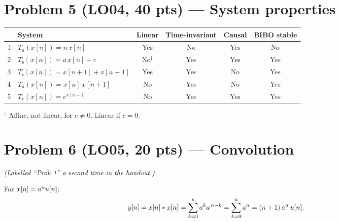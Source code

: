 \section*{Problem 5 \normalsize(LO04, 40 pts) --- System properties}

\begin{center}
\begin{tabular}{clcccc}
  \toprule
  & System & Linear & Time-invariant & Causal & BIBO stable \\
  \midrule
  1 & $T_a(x[n]) = n\,x[n]$          & Yes & No  & Yes & No  \\
  2 & $T_b(x[n]) = a\,x[n] + c$      & No$^\dagger$ & Yes & Yes & Yes \\
  3 & $T_c(x[n]) = x[n+1] + x[n-1]$  & Yes & Yes & No  & Yes \\
  4 & $T_d(x[n]) = x[n]\,x[n+1]$     & No  & Yes & No  & Yes \\
  5 & $T_e(x[n]) = e^{x[n-1]}$       & No  & Yes & Yes & Yes \\
  \bottomrule
\end{tabular}
\end{center}

{\footnotesize $^\dagger$ Affine, not linear, for $c \ne 0$. Linear if $c = 0$.}

\section*{Problem 6 \normalsize(LO05, 20 pts) --- Convolution}

{\footnotesize\itshape (Labelled ``Prob 1'' a second time in the handout.)}

For $x[n] = a^nu[n]$:
\begin{equation*}
  y[n] = x[n] \ast x[n]
       = \sum_{k=0}^{n} a^{k} a^{\,n-k}
       = \sum_{k=0}^{n} a^{n}
       = (n+1)\,a^{n}\,u[n].
\end{equation*}


